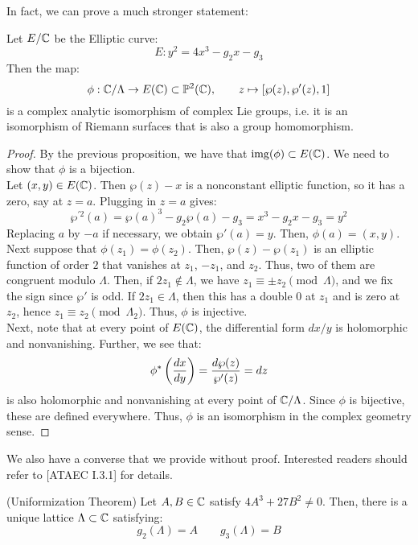 \documentclass[12pt]{article}
\begin{document}
In fact, we can prove a much stronger statement:
\begin{prop}
    Let $E/\mathbb C$ be the Elliptic curve:
    \[E : y^2 = 4x^3 - g_2x -g_3 \]
    Then the map: 
    \[ \phi: \mathbb C/\Lambda \to E(\mathbb C) \subset \mathbb P^2(\mathbb C), \qquad z \mapsto [\wp(z), \wp'(z), 1]\]
    is a complex analytic isomorphism of complex Lie groups, i.e. it is an isomorphism of Riemann surfaces that is also a group homomorphism. 
\end{prop}
\begin{proof}
    By the previous proposition, we have that $\operatorname{img}(\phi) \subset E(\mathbb C)$. We need to show that $\phi$ is a bijection. \\
    Let $(x, y) \in E(\mathbb C)$. Then $\wp(z)-x$ is a nonconstant elliptic function, so it has a zero, say at $z = a$. Plugging in $z = a$ gives:
    \[ \wp^{'2}(a) = \wp(a)^3 -g_2\wp(a) -g_3 = x^3-g_2x-g_3 = y^2 \]
    Replacing $a$ by $-a$ if necessary, we obtain $\wp'(a) = y$. Then, $\phi(a) = (x,y)$. \\
    Next suppose that $\phi(z_1) = \phi(z_2)$. Then, $\wp(z)-\wp(z_1)$ is an elliptic function of order $2$ that vanishes at $z_1$, $-z_1$, and $z_2$. Thus, two of them are congruent modulo $\Lambda$. Then, if $2z_1 \not \in \Lambda$, we have $z_1 \equiv \pm z_2 \pmod{\Lambda}$, and we fix the sign since $\wp'$ is odd. If $2z_1 \in \Lambda$, then this has a double $0$ at $z_1$ and is zero at $z_2$, hence $z_1 \equiv z_2 \pmod{\Lambda_2}$. Thus, $\phi$ is injective.  \\
    Next, note that at every point of $E(\mathbb C)$, the differential form $dx/y$ is holomorphic and nonvanishing. Further, we see that:
    \[ \phi^*\left(\frac{dx}{dy}\right) = \frac{d\wp(z)}{\wp'(z)} = dz\]
    is also holomorphic and nonvanishing at every point of $\mathbb C/\Lambda$. Since $\phi$ is bijective, these are defined everywhere. Thus, $\phi$ is an isomorphism in the complex geometry sense.
\end{proof}

We also have a converse that we provide without proof. Interested readers should refer to [ATAEC I.3.1] for details.

\begin{theorem}(Uniformization Theorem)
    Let $A, B \in \mathbb C$ satisfy $4A^3 + 27B^2 \ne 0$. Then, there is a unique lattice $\Lambda \subset \mathbb C$ satisfying:
    \[ g_2(\Lambda) = A \qquad g_3(\Lambda) = B \]
\end{theorem}
\end{document}
